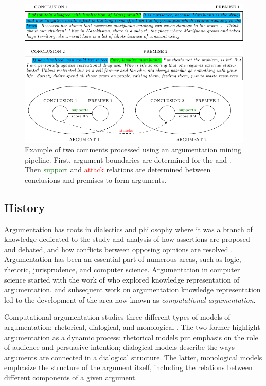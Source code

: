 \begin{figure}[t!]
	\centering
	\includegraphics{area_description_example-figure0.pdf}
\caption{Example of two comments processed using an argumentation mining pipeline. 
	First, argument boundaries are determined for the  and 
	. Then \textcolor{darkgreen}{support} and 
	\textcolor{red}{attack} relations are
	determined between conclusions and premises
	to form arguments.
	}
	\label{fig:example_pipeline}
\end{figure}

\subsection{History}

Argumentation has roots in dialectics and philosophy where it was a branch of
knowledge dedicated to the study and analysis of how assertions are proposed
and debated, and how conflicts between opposing opinions are resolved
\citep{bench2007argumentation}.  Argumentation has been an essential part of
numerous areas, such as logic, rhetoric, jurisprudence, and computer science. 
Argumentation in computer science started with 
the work of \citep{dung1995acceptability} who explored knowledge representation
of argumentation. \citet{dung1995acceptability} and subsequent work on argumentation
knowledge representation led to the development of 
the area now known as \emph{computational argumentation}. 

Computational argumentation studies three different types of models of argumentation:
rhetorical, dialogical, and monological \citep{bentahar2010taxonomy}. 
The two former highlight argumentation as a dynamic process: rhetorical models
put emphasis on the role of audience and persuasive intention; dialogical 
models describe the ways arguments are connected in a dialogical structure. 
The latter, monological models emphasize the structure of the argument itself, 
including the relations between different components of a given argument. 

